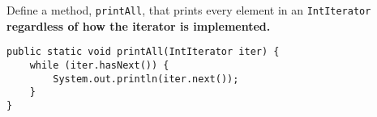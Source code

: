 \question Define a method, \lstinline$printAll$, that prints every element in
an \lstinline$IntIterator$ \textbf{regardless of how the iterator is
implemented.}

\begin{solution}[1in]
\begin{lstlisting}
public static void printAll(IntIterator iter) {
    while (iter.hasNext()) {
        System.out.println(iter.next());
    }
}
\end{lstlisting}
\end{solution}
